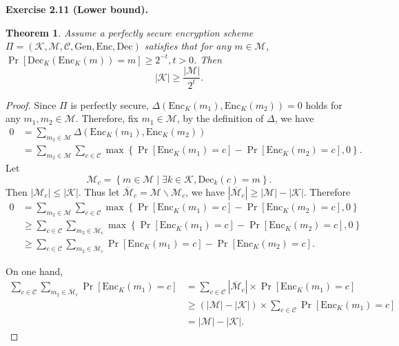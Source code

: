 \documentclass[a4paper]{article}
\newtheorem{theorem}{Theorem}
\newtheorem*{proof}{Proof}
\newenvironment{exercise}[1]{
	\par
	\noindent\textbf{Exercise #1.}\quad
}{
	\par
	\bigskip
}
\newcommand{\pbra}[1]{\left( #1 \right)}
\newcommand{\cbra}[1]{\left\{ #1 \right\}}
\newcommand{\sbra}[1]{\left[ #1 \right]}
\begin{document}
\begin{exercise}{2.11 (Lower bound)}
    \begin{theorem}
        Assume a perfectly secure encryption scheme $\Pi=(\mathcal K,\mathcal M,\mathcal C,\mathrm{Gen},\mathrm{Enc},\mathrm{Dec})$ 
        satisfies that for any $m\in\mathcal M$, $\Pr\sbra{\mathrm{Dec}_K(\mathrm{Enc}_K(m))=m}\geq2^{-t},t>0$. 
        Then 
        $$|\mathcal K|\geq\frac{|\mathcal M|}{2^t}.$$
    \end{theorem}
    \begin{proof}
        Since $\Pi$ is perfectly secure, 
        $\Delta\pbra{\mathrm{Enc}_K(m_1),\mathrm{Enc}_K(m_2)}=0$ holds for any $m_1,m_2\in\mathcal M$.
        Therefore, fix $m_1\in\mathcal M$, by the definition of $\Delta$, we have
        \begin{align*}
            0&=\sum_{m_2\in\mathcal M}\Delta\pbra{\mathrm{Enc}_K(m_1),\mathrm{Enc}_K(m_2)}\\
            &=\sum_{m_2\in\mathcal M}\sum_{c\in\mathcal C}
                \max\cbra{\Pr\sbra{\mathrm{Enc}_K(m_1)=c}-\Pr\sbra{\mathrm{Enc}_K(m_2)=c},0}.
        \end{align*}
        Let 
        $$
        \mathcal M_c=\cbra{m\in\mathcal M\mid \exists k\in\mathcal K,\mathrm{Dec}_k(c)=m}.
        $$
        Then $|\mathcal M_c|\leq |\mathcal K|$. Thus let $\overline{\mathcal M}_c=\mathcal M\backslash\mathcal{M}_c$, we have
        $|\overline{\mathcal M}_c|\geq|\mathcal M|-|\mathcal K|$. Therefore
        \begin{align*}
            0&=\sum_{m_2\in\mathcal M}\sum_{c\in\mathcal C}
                \max\cbra{\Pr\sbra{\mathrm{Enc}_K(m_1)=c}-\Pr\sbra{\mathrm{Enc}_K(m_2)=c},0}\\
            &\geq\sum_{c\in\mathcal C}\sum_{m_2\in\overline{\mathcal M}_c}
                \max\cbra{\Pr\sbra{\mathrm{Enc}_K(m_1)=c}-\Pr\sbra{\mathrm{Enc}_K(m_2)=c},0}\\
            &\geq\sum_{c\in\mathcal C}\sum_{m_2\in\overline{\mathcal M}_c}
                \Pr\sbra{\mathrm{Enc}_K(m_1)=c}-\Pr\sbra{\mathrm{Enc}_K(m_2)=c}.
        \end{align*}

        On one hand, 
        \begin{align*}
            \sum_{c\in\mathcal C}\sum_{m_2\in\overline{\mathcal M}_c}\Pr\sbra{\mathrm{Enc}_K(m_1)=c}
            &=\sum_{c\in\mathcal C}|\overline{\mathcal M}_c|\times\Pr\sbra{\mathrm{Enc}_K(m_1)=c}\\
            &\geq \pbra{|\mathcal M|-|\mathcal K|}\times\sum_{c\in\mathcal C}\Pr\sbra{\mathrm{Enc}_K(m_1)=c}\\
            &=|\mathcal M|-|\mathcal K|.
        \end{align*}


\end{proof}
\end{exercise}
\end{document}
